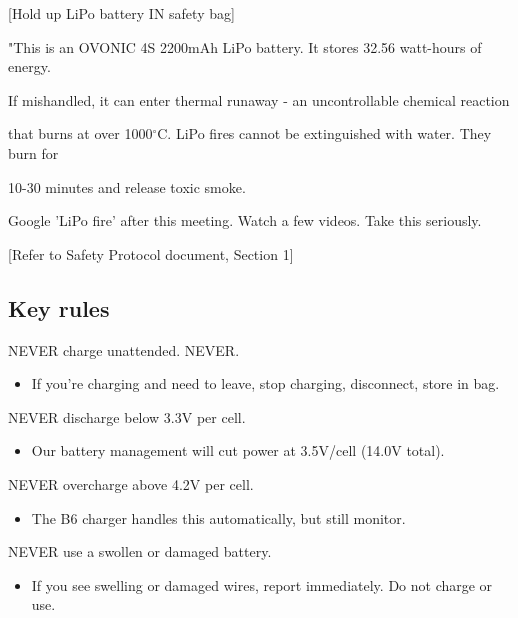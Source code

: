 \documentclass[11pt,letterpaper]{article}
\begin{document}
{[Hold up LiPo battery IN safety bag]\par

"This is an OVONIC 4S 2200mAh LiPo battery. It stores 32.56 watt-hours of energy.\par

If mishandled, it can enter thermal runaway - an uncontrollable chemical reaction\par

that burns at over 1000$^\circ$C. LiPo fires cannot be extinguished with water. They burn for\par

10-30 minutes and release toxic smoke.\par

Google 'LiPo fire' after this meeting. Watch a few videos. Take this seriously.\par

[Refer to Safety Protocol document, Section 1]\par

\subsection{Key rules}

NEVER charge unattended. NEVER.\par

\begin{itemize}
  \item If you're charging and need to leave, stop charging, disconnect, store in bag.
\end{itemize}

NEVER discharge below 3.3V per cell.\par

\begin{itemize}
  \item Our battery management will cut power at 3.5V/cell (14.0V total).
\end{itemize}

NEVER overcharge above 4.2V per cell.\par

\begin{itemize}
  \item The B6 charger handles this automatically, but still monitor.
\end{itemize}

NEVER use a swollen or damaged battery.\par

\begin{itemize}
  \item If you see swelling or damaged wires, report immediately. Do not charge or use.
\end{itemize}

}
\end{document}

